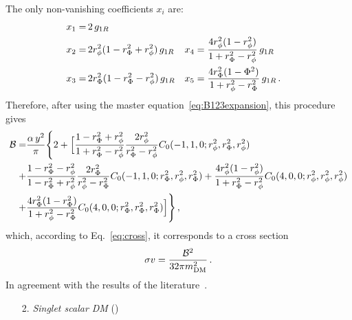 The only non-vanishing coefficients $x_i$ are: 
\begin{align}
x_1=\, & 2\,g_{1R} \nonumber\\ 
x_2=\, & 2r_\phi^2(1-r_{\Phi}^2+r_\phi^2)\,g_{1R} && x_4= \dfrac{4r_\phi^2(1-r_\phi^2)}{1+r_{\Phi}^2-r_\phi^2}\,g_{1R} \nonumber\\
x_3=\, & 2r_{\Phi}^2(1-r_{\Phi}^2-r_\phi^2)\,g_{1R} && x_5= \dfrac{4r_{\Phi}^2(1-{\Phi}^2)}{1+r_\phi^2-r_{\Phi}^2}\,g_{1R} \,.
\end{align}
%
Therefore, after using the master equation~\eqref{eq:B123expansion}, this procedure gives
%
\begin{align}
\mathcal{B}
=&\dfrac{\alpha\, y^2}{\pi} \Bigg{\{ } 2 + \Big{[}
 \dfrac{1-r_{\Phi}^2+r_\phi^2}{1+r_{\Phi}^2-r_\phi^2}\dfrac{2r_\phi^2}{r_{\Phi}^2-r_\phi^2}
 C_0(-1,1,0;r_\phi^2,r_{\Phi}^2,r_\phi^2)\nonumber \\
+&\dfrac{1-r_{\Phi}^2-r_\phi^2}{1-r_{\Phi}^2+r_\phi^2}\dfrac{2r_{\Phi}^2}{r_\phi^2-r_{\Phi}^2}C_0(-1,1,0;r_{\Phi}^2,r_\phi^2,r_{\Phi}^2)
+\dfrac{4r_\phi^2(1-r_\phi^2)}{1+r_{\Phi}^2-r_\phi^2}C_0(4,0,0;r_\phi^2,r_\phi^2,r_\phi^2)\nonumber \\
+&\dfrac{4r_{\Phi}^2(1-r_{\Phi}^2)}{1+r_\phi^2-r_{\Phi}^2}C_0(4,0,0;r_{\Phi}^2,r_{\Phi}^2,r_{\Phi}^2) \Big{] } \Bigg{\} } \,,
\end{align}
%
%
%
which, according to Eq.~\eqref{eq:cross}, it corresponds to a cross section
\begin{eqnarray}
\sigma v= \dfrac{\mathcal{B}^2}{32\pi m_{\text{DM}}^2} \,.
\end{eqnarray}
%
In agreement with the results of the literature~\cite{Ibarra:2014qma}. 
%
%
%
\begin{enumerate}
\item[2.] \textit{ Singlet scalar DM} () 
\end{enumerate}

